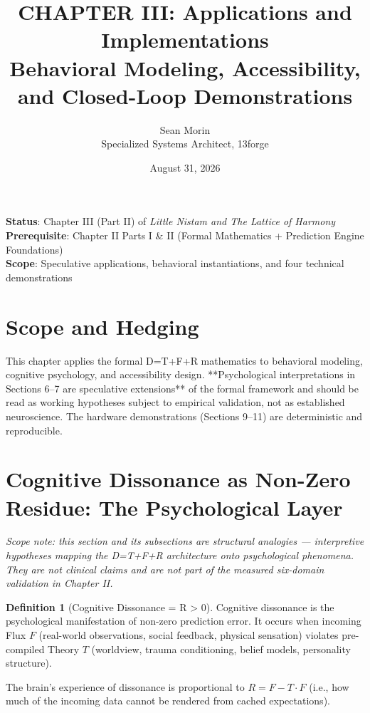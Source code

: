 \documentclass[11pt,oneside]{article}
\title{CHAPTER III: Applications and Implementations\\
Behavioral Modeling, Accessibility, and Closed-Loop Demonstrations}
\author{Sean Morin \\ Specialized Systems Architect, 13forge}
\date{August 31, 2026}
\theoremstyle{definition}
\newtheorem{definition}[theorem]{Definition}
\begin{document}
\maketitle

\begin{center}
\textbf{Status}: Chapter III (Part II) of \emph{Little Nistam and The Lattice of Harmony} \\
\textbf{Prerequisite}: Chapter II Parts I \& II (Formal Mathematics + Prediction Engine Foundations) \\
\textbf{Scope}: Speculative applications, behavioral instantiations, and four technical demonstrations
\end{center}

\section*{Scope and Hedging}

This chapter applies the formal D=T+F+R mathematics to behavioral modeling, cognitive psychology, and accessibility design. **Psychological interpretations in Sections 6--7 are speculative extensions** of the formal framework and should be read as working hypotheses subject to empirical validation, not as established neuroscience. The hardware demonstrations (Sections 9--11) are deterministic and reproducible.

\section{Cognitive Dissonance as Non-Zero Residue: The Psychological Layer}

\textit{Scope note: this section and its subsections are structural analogies --- interpretive hypotheses mapping the D=T+F+R architecture onto psychological phenomena. They are not clinical claims and are not part of the measured six-domain validation in Chapter II.}

\begin{definition}[Cognitive Dissonance = R > 0]
Cognitive dissonance is the psychological manifestation of non-zero prediction error. It occurs when incoming Flux $F$ (real-world observations, social feedback, physical sensation) violates pre-compiled Theory $T$ (worldview, trauma conditioning, belief models, personality structure).

The brain's experience of dissonance is proportional to $R = F - T \cdot F$ (i.e., how much of the incoming data cannot be rendered from cached expectations).
\end{definition}
\end{document}
